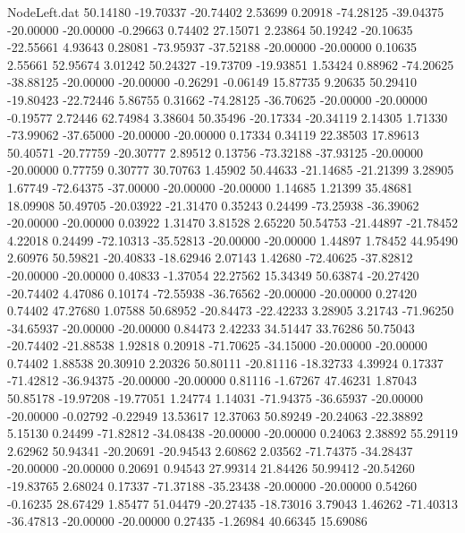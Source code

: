 \begin{filecontents}{NodeLeft.dat}
  50.14180  -19.70337  -20.74402     2.53699    0.20918  -74.28125  -39.04375  -20.00000  -20.00000   -0.29663    0.74402   27.15071    2.23864
  50.19242  -20.10635  -22.55661     4.93643    0.28081  -73.95937  -37.52188  -20.00000  -20.00000    0.10635    2.55661   52.95674    3.01242
  50.24327  -19.73709  -19.93851     1.53424    0.88962  -74.20625  -38.88125  -20.00000  -20.00000   -0.26291   -0.06149   15.87735    9.20635
  50.29410  -19.80423  -22.72446     5.86755    0.31662  -74.28125  -36.70625  -20.00000  -20.00000   -0.19577    2.72446   62.74984    3.38604
  50.35496  -20.17334  -20.34119     2.14305    1.71330  -73.99062  -37.65000  -20.00000  -20.00000    0.17334    0.34119   22.38503   17.89613
  50.40571  -20.77759  -20.30777     2.89512    0.13756  -73.32188  -37.93125  -20.00000  -20.00000    0.77759    0.30777   30.70763    1.45902
  50.44633  -21.14685  -21.21399     3.28905    1.67749  -72.64375  -37.00000  -20.00000  -20.00000    1.14685    1.21399   35.48681   18.09908
  50.49705  -20.03922  -21.31470     0.35243    0.24499  -73.25938  -36.39062  -20.00000  -20.00000    0.03922    1.31470    3.81528    2.65220
  50.54753  -21.44897  -21.78452     4.22018    0.24499  -72.10313  -35.52813  -20.00000  -20.00000    1.44897    1.78452   44.95490    2.60976
  50.59821  -20.40833  -18.62946     2.07143    1.42680  -72.40625  -37.82812  -20.00000  -20.00000    0.40833   -1.37054   22.27562   15.34349
  50.63874  -20.27420  -20.74402     4.47086    0.10174  -72.55938  -36.76562  -20.00000  -20.00000    0.27420    0.74402   47.27680    1.07588
  50.68952  -20.84473  -22.42233     3.28905    3.21743  -71.96250  -34.65937  -20.00000  -20.00000    0.84473    2.42233   34.51447   33.76286
  50.75043  -20.74402  -21.88538     1.92818    0.20918  -71.70625  -34.15000  -20.00000  -20.00000    0.74402    1.88538   20.30910    2.20326
  50.80111  -20.81116  -18.32733     4.39924    0.17337  -71.42812  -36.94375  -20.00000  -20.00000    0.81116   -1.67267   47.46231    1.87043
  50.85178  -19.97208  -19.77051     1.24774    1.14031  -71.94375  -36.65937  -20.00000  -20.00000   -0.02792   -0.22949   13.53617   12.37063
  50.89249  -20.24063  -22.38892     5.15130    0.24499  -71.82812  -34.08438  -20.00000  -20.00000    0.24063    2.38892   55.29119    2.62962
  50.94341  -20.20691  -20.94543     2.60862    2.03562  -71.74375  -34.28437  -20.00000  -20.00000    0.20691    0.94543   27.99314   21.84426
  50.99412  -20.54260  -19.83765     2.68024    0.17337  -71.37188  -35.23438  -20.00000  -20.00000    0.54260   -0.16235   28.67429    1.85477
  51.04479  -20.27435  -18.73016     3.79043    1.46262  -71.40313  -36.47813  -20.00000  -20.00000    0.27435   -1.26984   40.66345   15.69086

\end{filecontents}
